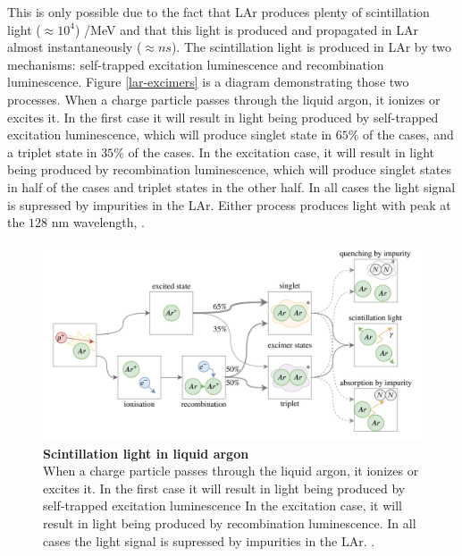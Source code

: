 This is only possible due to the fact that LAr produces plenty of scintillation light ($\approx 10^4 $) /MeV and that this light is produced and propagated in LAr almost instantaneously ($\approx ns$). The scintillation light is produced in LAr by two mechanisms: self-trapped excitation luminescence and recombination luminescence. Figure \ref{lar-excimers} is a diagram demonstrating those two processes. When a charge particle passes through the liquid argon, it ionizes or excites it. In the first case it will result in light being produced by self-trapped excitation luminescence, which will produce singlet state in $65\%$ of the cases, and a triplet state in $35\%$ of the cases. In the excitation case, it will result in light being produced by recombination luminescence, which will produce singlet states in half of the cases and triplet states in the other half. In all cases the light signal is supressed by impurities in the LAr. Either process produces light with peak at the $128$ nm wavelength, \cite{lar_excimers}.

\begin{figure}[h!]
    \begin{center}
        \includegraphics[scale=0.35]{Figures/lar_excimers.png}
        \caption[Scintillation light in liquid argon]{{\textbf{Scintillation light in liquid argon}} \\When a charge particle passes through the liquid argon, it ionizes or excites it. In the first case it will result in light being produced by self-trapped excitation luminescence In the excitation case, it will result in light being produced by recombination luminescence. In all cases the light signal is supressed by impurities in the LAr. \cite{lar_excimers}.}
        \label{uboone_cryo} 
    \end{center}
\end{figure}

